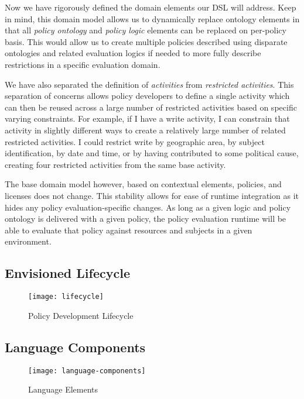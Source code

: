 Now we have rigorously defined the domain elements our DSL will address.  Keep in mind, this domain model allows us to dynamically replace ontology elements in that all \textit{policy ontology} and \textit{policy logic} elements can be replaced on per-policy basis.  This would allow us to create multiple policies described using disparate ontologies and related evaluation logics if needed to more fully describe restrictions in a specific evaluation domain.

We have also separated the definition of \textit{activities} from \textit{restricted activities}.  This separation of concerns allows policy developers to define a single activity which can then be reused across a large number of restricted activities based on specific varying constraints.  For example, if I have a write activity, I can constrain that activity in slightly different ways to create a relatively large number of related restricted activities.  I could restrict write by geographic area, by subject identification, by date and time, or by having contributed to some political cause, creating four restricted activities from the same base activity.

The base domain model however, based on contextual elements, policies, and licenses does not change.  This stability allows for ease of runtime integration as it hides any policy evaluation-specific changes.  As long as a given logic and policy ontology is delivered with a given policy, the policy evaluation runtime will be able to evaluate that policy against resources and subjects in a given environment.

\subsection{Envisioned Lifecycle}

\begin{figure}[!t]
\centering
\texttt{[image: lifecycle]}
\caption{Policy Development Lifecycle}
\label{fig:model:lifecycle}
\end{figure}

\subsection{Language Components}

\begin{figure}[!t]
\centering
\texttt{[image: language-components]}
\caption{Language Elements}
\label{fig:model:language-components}
\end{figure}
